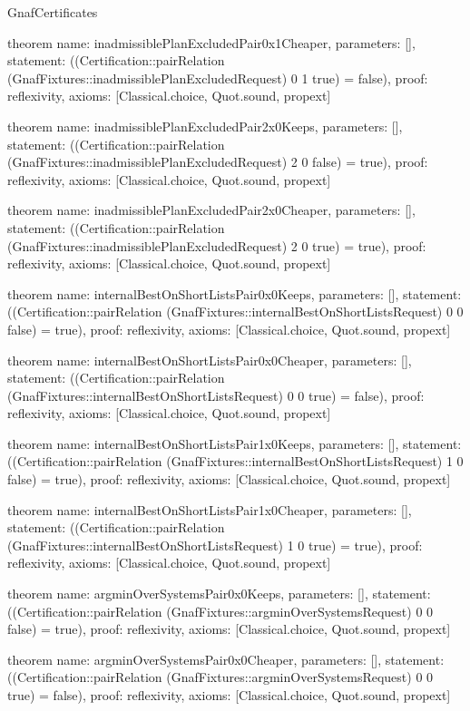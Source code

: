 \begin{lexlean}{GnafCertificates}
\begin{semanticmodule}
theorem{
  name: inadmissiblePlanExcludedPair0x1Cheaper,
  parameters: [],
  statement: ((Certification::pairRelation (GnafFixtures::inadmissiblePlanExcludedRequest) 0 1 true) = false),
  proof: reflexivity{},
  axioms: [Classical.choice, Quot.sound, propext]
}

theorem{
  name: inadmissiblePlanExcludedPair2x0Keeps,
  parameters: [],
  statement: ((Certification::pairRelation (GnafFixtures::inadmissiblePlanExcludedRequest) 2 0 false) = true),
  proof: reflexivity{},
  axioms: [Classical.choice, Quot.sound, propext]
}

theorem{
  name: inadmissiblePlanExcludedPair2x0Cheaper,
  parameters: [],
  statement: ((Certification::pairRelation (GnafFixtures::inadmissiblePlanExcludedRequest) 2 0 true) = true),
  proof: reflexivity{},
  axioms: [Classical.choice, Quot.sound, propext]
}

theorem{
  name: internalBestOnShortListsPair0x0Keeps,
  parameters: [],
  statement: ((Certification::pairRelation (GnafFixtures::internalBestOnShortListsRequest) 0 0 false) = true),
  proof: reflexivity{},
  axioms: [Classical.choice, Quot.sound, propext]
}

theorem{
  name: internalBestOnShortListsPair0x0Cheaper,
  parameters: [],
  statement: ((Certification::pairRelation (GnafFixtures::internalBestOnShortListsRequest) 0 0 true) = false),
  proof: reflexivity{},
  axioms: [Classical.choice, Quot.sound, propext]
}

theorem{
  name: internalBestOnShortListsPair1x0Keeps,
  parameters: [],
  statement: ((Certification::pairRelation (GnafFixtures::internalBestOnShortListsRequest) 1 0 false) = true),
  proof: reflexivity{},
  axioms: [Classical.choice, Quot.sound, propext]
}

theorem{
  name: internalBestOnShortListsPair1x0Cheaper,
  parameters: [],
  statement: ((Certification::pairRelation (GnafFixtures::internalBestOnShortListsRequest) 1 0 true) = true),
  proof: reflexivity{},
  axioms: [Classical.choice, Quot.sound, propext]
}

theorem{
  name: argminOverSystemsPair0x0Keeps,
  parameters: [],
  statement: ((Certification::pairRelation (GnafFixtures::argminOverSystemsRequest) 0 0 false) = true),
  proof: reflexivity{},
  axioms: [Classical.choice, Quot.sound, propext]
}

theorem{
  name: argminOverSystemsPair0x0Cheaper,
  parameters: [],
  statement: ((Certification::pairRelation (GnafFixtures::argminOverSystemsRequest) 0 0 true) = false),
  proof: reflexivity{},
  axioms: [Classical.choice, Quot.sound, propext]
}


\end{semanticmodule}
\end{lexlean}

